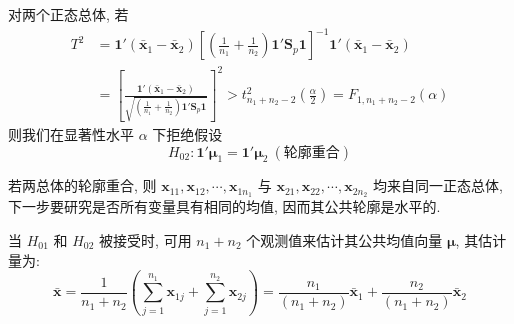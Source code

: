 \begin{mvframe}

对两个正态总体, 若
\label{eq:6-74}
\begin{equation}
\begin{aligned}
T^2&=\mathbf{1}'(\bar{\mathbf{x}}_1-\bar{\mathbf{x}}_2)\left[\left(\frac{1}{n_1}+\frac{1}{n_2}\right)\mathbf{1}'\mathbf{S}_p\mathbf{1}\right]^{-1}\mathbf{1}'(\bar{\mathbf{x}}_1-\bar{\mathbf{x}}_2)\\
&=\left[\frac{\mathbf{1}'(\bar{\mathbf{x}}_1-\bar{\mathbf{x}}_2)}{\sqrt{\left(\frac{1}{n_1}+\frac{1}{n_2}\right)\mathbf{1}'\mathbf{S}_p\mathbf{1}}}\right]^2>t_{n_1+n_2-2}^2\left(\frac{\alpha}{2}\right)=F_{1,n_1+n_2-2}(\alpha)
\end{aligned}
\tag{6-74}
\end{equation}
则我们在显著性水平 $\alpha$ 下拒绝假设
\[
H_{02}: \mathbf{1}'\boldsymbol{\mu}_1=\mathbf{1}'\boldsymbol{\mu}_2\ (\text{轮廓重合})
\]
\end{mvframe}

若两总体的轮廓重合, 则 $\mathbf{x}_{11},\mathbf{x}_{12},\cdots,\mathbf{x}_{1n_1}$ 与 $\mathbf{x}_{21},\mathbf{x}_{22},\cdots,\mathbf{x}_{2n_2}$ 均来自同一正态总体, 下一步要研究是否所有变量具有相同的均值, 因而其公共轮廓是水平的.

当 $H_{01}$ 和 $H_{02}$ 被接受时, 可用 $n_1+n_2$ 个观测值来估计其公共均值向量 $\boldsymbol{\mu}$, 其估计量为:
\[
\bar{\mathbf{x}}=\frac{1}{n_1+n_2}\left(\sum_{j=1}^{n_1}\mathbf{x}_{1j}+\sum_{j=1}^{n_2}\mathbf{x}_{2j}\right)=\frac{n_1}{(n_1+n_2)}\bar{\mathbf{x}}_1+\frac{n_2}{(n_1+n_2)}\bar{\mathbf{x}}_2
\]
